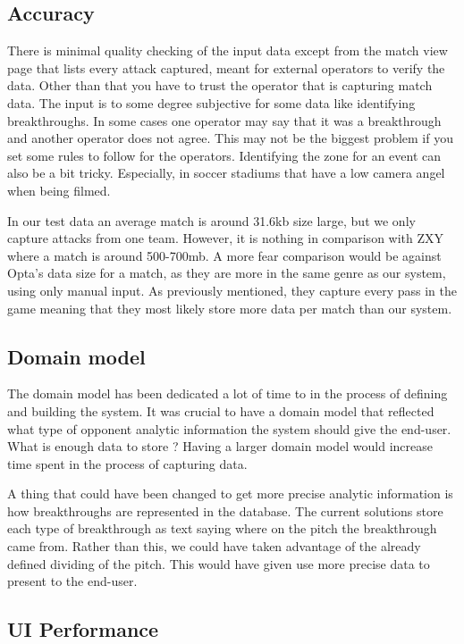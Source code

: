 \subsection{Accuracy}

There is minimal quality checking of the input data except from the match view page that lists every attack captured, meant for external operators to verify the data. Other than that you have to trust the operator that is capturing match data. The input is to some degree subjective for some data like identifying breakthroughs. In some cases one operator may say that it was a breakthrough and another operator does not agree. This may not be the biggest problem if you set some rules to follow for the operators. Identifying the zone for an event can also be a bit tricky. Especially, in soccer stadiums that have a low camera angel when being filmed. 

In our test data an average match is around 31.6kb size large, but we only capture attacks from one team. However, it is nothing in comparison with ZXY where a match is around 500-700mb. A more fear comparison would be against Opta’s data size for a match, as they are more in the same genre as our system, using only manual input. As previously mentioned, they capture every pass in the game meaning that they most likely store more data per match than our system. 

\subsection{Domain model}
The domain model has been dedicated a lot of time to in the process of defining and building the system. It was crucial to have a domain model that reflected what type of opponent analytic information the system should give the end-user. What is enough data to store ? Having a larger domain model would increase time spent in the process of capturing data. 

A thing that could have been changed to get more precise analytic information is how breakthroughs are represented in the database. The current solutions store each type of breakthrough as text saying where on the pitch the breakthrough came from. Rather than this, we could have taken advantage of the already defined dividing of the pitch. This would have given use more precise data to present to the end-user.

\subsection{UI Performance}

